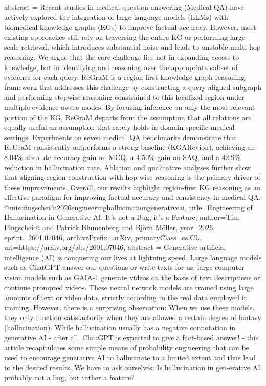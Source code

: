 {      abstract = {Recent studies in medical question answering (Medical QA) have actively explored the integration of large language models (LLMs) with biomedical knowledge graphs (KGs) to improve factual accuracy. However, most existing approaches still rely on traversing the entire KG or performing large-scale retrieval, which introduces substantial noise and leads to unstable multi-hop reasoning. We argue that the core challenge lies not in expanding access to knowledge, but in identifying and reasoning over the appropriate subset of evidence for each query. ReGraM is a region-first knowledge graph reasoning framework that addresses this challenge by constructing a query-aligned subgraph and performing stepwise reasoning constrained to this localized region under multiple evidence aware modes. By focusing inference on only the most relevant portion of the KG, ReGraM departs from the assumption that all relations are equally useful an assumption that rarely holds in domain-specific medical settings. Experiments on seven medical QA benchmarks demonstrate that ReGraM consistently outperforms a strong baseline (KGARevion), achieving an 8.04\% absolute accuracy gain on MCQ, a 4.50\% gain on SAQ, and a 42.9\% reduction in hallucination rate. Ablation and qualitative analyses further show that aligning region construction with hop-wise reasoning is the primary driver of these improvements. Overall, our results highlight region-first KG reasoning as an effective paradigm for improving factual accuracy and consistency in medical QA.}
}@misc{fingscheidt2026engineeringhallucinationgenerativeai,
      title={Engineering of Hallucination in Generative AI: It's not a Bug, it's a Feature}, 
      author={Tim Fingscheidt and Patrick Blumenberg and Björn Möller},
      year={2026},
      eprint={2601.07046},
      archivePrefix={arXiv},
      primaryClass={cs.CL},
      url={https://arxiv.org/abs/2601.07046},
      abstract = {Generative artificial intelligence (AI) is conquering our lives at lightning speed. Large language models such as ChatGPT answer our questions or write texts for us, large computer vision models such as GAIA-1 generate videos on the basis of text descriptions or continue prompted videos. These neural network models are trained using large amounts of text or video data, strictly according to the real data employed in training. However, there is a surprising observation: When we use these models, they only function satisfactorily when they are allowed a certain degree of fantasy (hallucination). While hallucination usually has a negative connotation in generative AI - after all, ChatGPT is expected to give a fact-based answer! - this article recapitulates some simple means of probability engineering that can be used to encourage generative AI to hallucinate to a limited extent and thus lead to the desired results. We have to ask ourselves: Is hallucination in gen-erative AI probably not a bug, but rather a feature?}
}
